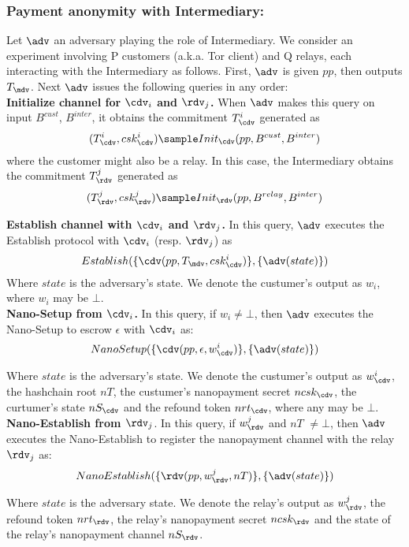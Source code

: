 \subsubsection{Payment anonymity with Intermediary:} 
Let $\adv$ an adversary playing the role of Intermediary. We consider an experiment involving P customers (a.k.a. Tor client) and Q relays, each interacting with the Intermediary as follows. First, $\adv$ is given $pp$, then outputs $T_\mdv$. Next $\adv$ issues the following queries in any order:\\

\textbf{Initialize channel for $\cdv_i$ and $\rdv_j$.} When $\adv$ makes this query on input $B^{cust}$, $B^{inter}$, it obtains the commitment $T^i_\cdv$ generated as 
$$(T^i_\cdv, csk^i_\cdv) \sample Init_\cdv(pp, B^{cust}, B^{inter})$$
where the customer might also be a relay. In this case, the Intermediary obtains the commitment $T^j_\rdv$ generated as $$(T^j_\rdv, csk^j_\rdv) \sample Init_\rdv(pp, B^{relay}, B^{inter})$$  

\textbf{Establish channel with $\cdv_i$ and $\rdv_j$.} In this query, $\adv$ executes the Establish protocol with $\cdv_i$ (resp. $\rdv_j$) as
$$Establish(\{\cdv(pp, T_\mdv, csk^i_\cdv)\},\{\adv(state)\})$$
Where $state$ is the adversary's state. We denote the custumer's output as $w_i$, where $w_i$ may be $\bot$.\\

\textbf{Nano-Setup from $\cdv_i$.} In this query, if $w_i \neq \bot$, then $\adv$ executes the Nano-Setup to escrow $\epsilon$ with $\cdv_i$ as:
$$Nano\-Setup(\{\cdv(pp, \epsilon, w^i_\cdv)\}, \{\adv(state)\})$$

Where $state$ is the adversary's state. We denote the custumer's output as $w^i_\cdv$, the hashchain root $nT$, the custumer's nanopayment secret $ncsk_\cdv$, the curtumer's state $nS_\cdv$ and the refound token $nrt_\cdv$, where any may be $\bot$.\\

\textbf{Nano-Establish from $\rdv_j$}. In this query, if $w^j_\rdv$ and $nT$ $\neq \bot$, then $\adv$ executes the Nano-Establish to register the nanopayment channel with the relay $\rdv_j$ as:
$$Nano\-Establish(\{\rdv(pp, w^j_\rdv, nT)\}, \{\adv(state)\})$$

Where $state$ is the adversary state. We denote the relay's output as $w^j_\rdv$, the refound token $nrt_\rdv$, the relay's nanopayment secret $ncsk_\rdv$ and the state of the relay's nanopayment channel $nS_\rdv$. \\

